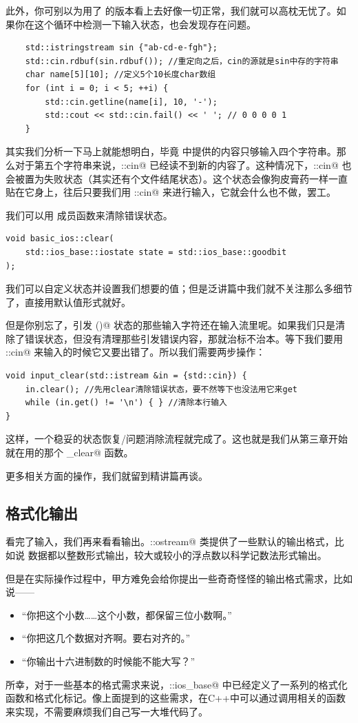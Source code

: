 此外，你可别以为用了 \lstinline@getline@ 的版本看上去好像一切正常，我们就可以高枕无忧了。如果你在这个循环中检测一下输入状态，也会发现存在问题。
\begin{lstlisting}
    std::istringstream sin {"ab-cd-e-fgh"};
    std::cin.rdbuf(sin.rdbuf()); //重定向之后，cin的源就是sin中存的字符串
    char name[5][10]; //定义5个10长度char数组
    for (int i = 0; i < 5; ++i) {
        std::cin.getline(name[i], 10, '-');
        std::cout << std::cin.fail() << ' '; // 0 0 0 0 1
    }
\end{lstlisting}
其实我们分析一下马上就能想明白，毕竟 \lstinline@sin@ 中提供的内容只够输入四个字符串。那么对于第五个字符串来说，\lstinline@std::cin@ 已经读不到新的内容了。这种情况下，\lstinline@std::cin@ 也会被置为失败状态（其实还有个文件结尾状态）。这个状态会像狗皮膏药一样一直贴在它身上，往后只要我们用 \lstinline@std::cin@ 来进行输入，它就会什么也不做，罢工。\par
我们可以用 \lstinline@clear@ 成员函数来清除错误状态。
\begin{lstlisting}
void basic_ios::clear(
    std::ios_base::iostate state = std::ios_base::goodbit
);
\end{lstlisting}
我们可以自定义状态并设置我们想要的值；但是泛讲篇中我们就不关注那么多细节了，直接用默认值形式就好。\par
但是你别忘了，引发 \lstinline@fail()@ 状态的那些输入字符还在输入流里呢。如果我们只是清除了错误状态，但没有清理那些引发错误内容，那就治标不治本。等下我们要用 \lstinline@std::cin@ 来输入的时候它又要出错了。所以我们需要两步操作：
\begin{lstlisting}
void input_clear(std::istream &in = {std::cin}) {
    in.clear(); //先用clear清除错误状态，要不然等下也没法用它来get
    while (in.get() != '\n') { } //清除本行输入
}
\end{lstlisting}
这样，一个稳妥的状态恢复/问题消除流程就完成了。这也就是我们从第三章开始就在用的那个 \lstinline@input_clear@ 函数。\par
更多相关方面的操作，我们就留到精讲篇再谈。\par
\subsection*{格式化输出}
看完了输入，我们再来看看输出。\lstinline@std::ostream@ 类提供了一些默认的输出格式，比如说 \lstinline@bool@ 数据都以整数形式输出，较大或较小的浮点数以科学记数法形式输出。\par
但是在实际操作过程中，甲方难免会给你提出一些奇奇怪怪的输出格式需求，比如说——
\begin{itemize}
    \item ``你把这个小数……这个小数，都保留三位小数啊。''
    \item ``你把这几个数据对齐啊。要右对齐的。''
    \item ``你输出十六进制数的时候能不能大写？''
\end{itemize}
所幸，对于一些基本的格式需求来说，\lstinline@std::ios_base@ 中已经定义了一系列的格式化函数和格式化标记。像上面提到的这些需求，在C++中可以通过调用相关的函数来实现，不需要麻烦我们自己写一大堆代码了。\par
